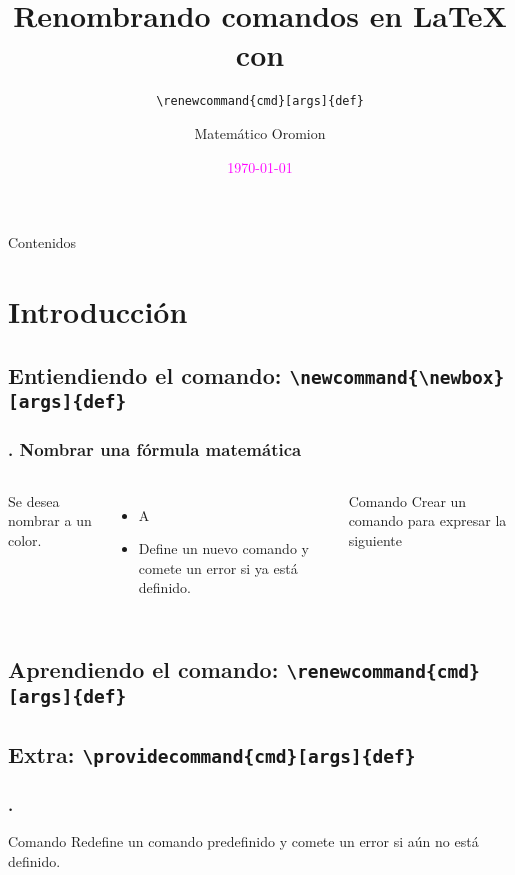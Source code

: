\documentclass[12pt]{beamer}
\begin{document}
	\author{Matemático Oromion}
	\title{Renombrando comandos en \LaTeX{} con}
	\cprotect\subtitle{\verb|\renewcommand{cmd}[args]{def}|}
	\logo{\LaTeX{}}
	\date{\textcolor{magenta}{\today}}
	\subject{Fin del curso}
	\begin{frame}[plain]
	\maketitle
\end{frame}


\begin{frame}{Contenidos}{}
\tableofcontents
\end{frame}
\section{Introducción}
\cprotect\subsection{Entiendiendo el comando: \verb!\newcommand{\newbox}[args]{def}!}

\begin{frame}
\frametitle{\thesection. Nombrar una fórmula matemática}
\begin{columns}
	Se desea nombrar a un color.
	\begin{itemize}
		\item A
		\item Define un nuevo comando y comete un error si ya está definido.
	\end{itemize}
	\begin{examples}{Comando }
	Crear un comando para expresar la siguiente
	\end{examples}
\end{columns}
\end{frame}

\cprotect\subsection{Aprendiendo el comando: \verb!\renewcommand{cmd}[args]{def}!}
\cprotect\subsection{Extra: \verb!\providecommand{cmd}[args]{def}!}
\begin{frame}
\frametitle{\thesection.}
\begin{block}{Comando }
Redefine un comando predefinido y comete un error si aún no está definido.
\end{block}
\end{frame}
\end{document}
